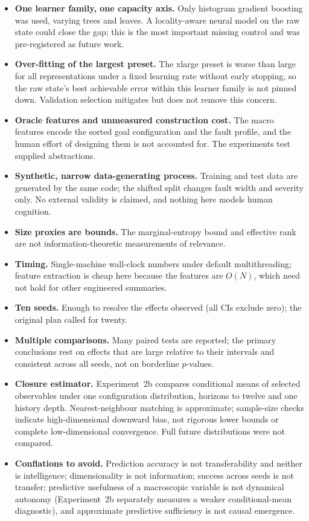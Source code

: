 \documentclass[11pt,a4paper]{article}
\begin{document}
\begin{itemize}
\item \textbf{One learner family, one capacity axis.} Only histogram gradient
  boosting was used, varying trees and leaves. A locality-aware neural model on
  the raw state could close the gap; this is the most important missing control
  and was pre-registered as future work.
\item \textbf{Over-fitting of the largest preset.} The xlarge preset is worse
  than large for all representations under a fixed learning rate without early
  stopping, so the raw state's best achievable error within this learner family
  is not pinned down. Validation selection mitigates but does not remove this
  concern.
\item \textbf{Oracle features and unmeasured construction cost.} The macro
  features encode the sorted goal configuration and the fault profile, and the
  human effort of designing them is not accounted for. The experiments test
  supplied abstractions.
\item \textbf{Synthetic, narrow data-generating process.} Training and test
  data are generated by the same code; the shifted split changes fault width
  and severity only. No external validity is claimed, and nothing here models
  human cognition.
\item \textbf{Size proxies are bounds.} The marginal-entropy bound and
  effective rank are not information-theoretic measurements of relevance.
\item \textbf{Timing.} Single-machine wall-clock numbers under default
  multithreading; feature extraction is cheap here because the features are
  $O(N)$, which need not hold for other engineered summaries.
\item \textbf{Ten seeds.} Enough to resolve the effects observed (all CIs
  exclude zero); the original plan called for twenty.
\item \textbf{Multiple comparisons.} Many paired tests are reported; the
  primary conclusions rest on effects that are large relative to their
  intervals and consistent across all seeds, not on borderline $p$-values.
\item \textbf{Closure estimator.} Experiment~2b compares conditional means of
  selected observables under one configuration distribution, horizons to
  twelve and one history depth. Nearest-neighbour matching is approximate;
  sample-size checks indicate high-dimensional downward bias, not rigorous
  lower bounds or complete low-dimensional convergence. Full future
  distributions were not compared.
\item \textbf{Conflations to avoid.} Prediction accuracy is not
  transferability and neither is intelligence; dimensionality is not
  information; success across seeds is not transfer; predictive usefulness of
  a macroscopic variable is not dynamical autonomy (Experiment~2b separately measures a weaker
  conditional-mean diagnostic), and approximate predictive sufficiency is not causal
  emergence.
\end{itemize}
\end{document}
